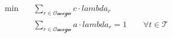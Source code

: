 \begin{align}
  \min\quad & \sum_{r \in \mathcal{Omega}} c \cdot \mathit{lambda}_{r} \tag{objective} \\
  & \sum_{r \in \mathcal{Omega}} a \cdot \mathit{lambda}_{r} = 1 \qquad \forall t \in \mathcal{T} \tag{trip\_cover\_partitioning} \\
\end{align}
